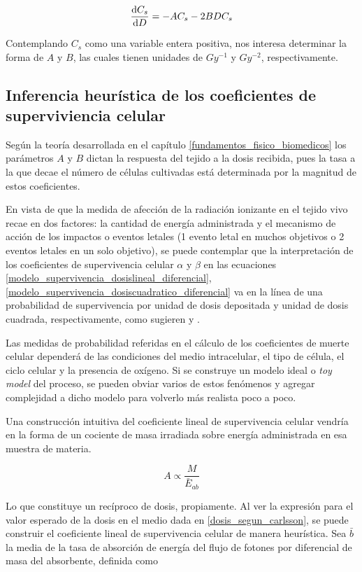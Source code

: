 \documentclass[12pt,letterpaper, oneside]{book}
\begin{document}
	\begin{equation}
		\dv{C_s}{D}=-A C_s -2B DC_s\label{modelo_supervivencia_dosiscuadratico_diferencial}
	\end{equation}
	
	\noindent Contemplando $C_s$ como una variable entera positiva, nos interesa determinar la forma de $A$ y $B$, las cuales tienen unidades de $\unit{Gy^{-1}}$ y $\unit{Gy^{-2}}$, respectivamente. 
	
	\subsection{Inferencia heurística de los coeficientes de superviviencia celular}\label{inferencia_heuristica_coeficientes}
	Según la teoría desarrollada en el capítulo \ref{fundamentos_fisico_biomedicos} los parámetros $A$ y $B$ dictan la respuesta del tejido a la dosis recibida, pues la tasa a la que decae el número de células cultivadas está determinada por la magnitud de estos coeficientes. 
	
	En vista de que la medida de afección de la radiación ionizante en el tejido vivo recae en dos factores: la cantidad de energía administrada y el mecanismo de acción de los impactos o eventos letales (1 evento letal en muchos objetivos o 2 eventos letales en un solo objetivo), se puede contemplar que la interpretación de los coeficientes de supervivencia celular $\alpha$ y $\beta$ en las ecuaciones \ref{modelo_supervivencia_dosislineal_diferencial}, \ref{modelo_supervivencia_dosiscuadratico_diferencial} va en la línea de una probabilidad de supervivencia por unidad de dosis depositada y unidad de dosis cuadrada, respectivamente, como sugieren \cite{Tubiana.1990} y \cite{McMahon.2018}. 
	
	Las medidas de probabilidad referidas en el cálculo de los coeficientes de muerte celular dependerá de las condiciones del medio intracelular, el tipo de célula, el ciclo celular y la presencia de oxígeno. Si se construye un modelo ideal o \textit{toy model} del proceso, se pueden obviar varios de estos fenómenos y agregar complejidad a dicho modelo para volverlo más realista poco a poco. 
	
	Una construcción intuitiva del coeficiente lineal de supervivencia celular vendría en la forma de un cociente de masa irradiada sobre energía administrada en esa muestra de materia. 
	
	$$A\propto\frac{M}{\bar{E}_{ab}}$$
		
	Lo que constituye un recíproco de dosis, propiamente. Al ver la expresión para el valor esperado de la dosis en el medio dada en \ref{dosis_segun_carlsson}, se puede construir el coeficiente lineal de supervivencia celular de manera heurística. Sea $\bar{b}$ la media de la tasa de absorción de energía del flujo de fotones por diferencial de masa del absorbente, definida como
\end{document}
